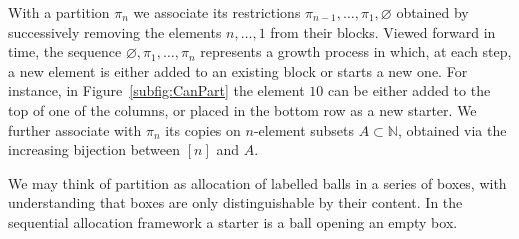 \documentclass{article}
\begin{document}
With a partition $\pi_n$ we associate its restrictions
$\pi_{n-1},\ldots,\pi_1,\varnothing$ obtained by successively removing the elements $n,\ldots,1$ from their blocks.
Viewed forward in time, the sequence
$\varnothing,\pi_1,\ldots,\pi_n$
represents a growth process in which, at each step, a new element is either added to an existing block or starts a new one.
For instance, in Figure~\ref{subfig:CanPart} 
the element $10$ can be either added to the top of one of the columns, or placed in the bottom row as a new starter.
We further associate with $\pi_n$ its copies on $n$-element subsets
$A\subset\mathbb N$, obtained via the increasing bijection between $[n]$ and $A$.

We may think of partition as allocation of labelled balls in a series of boxes, with understanding that boxes are only distinguishable by their content. 
In the sequential allocation framework a starter is a ball opening an empty box. 
\end{document}
